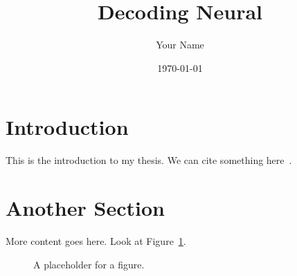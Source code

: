 \documentclass{article} %
\title{Decoding Neural }
\author{Your Name}
\date{\today}
\begin{document}
\maketitle

\section{Introduction}
This is the introduction to my thesis.
We can cite something here~\cite{example_key}.

\section{Another Section}
More content goes here.
Look at Figure~\ref{fig:myfigure}.

\begin{figure}[htbp]
    \centering
    \caption{A placeholder for a figure.}
    \label{fig:myfigure}
\end{figure}

\printbibliography
\end{document}
